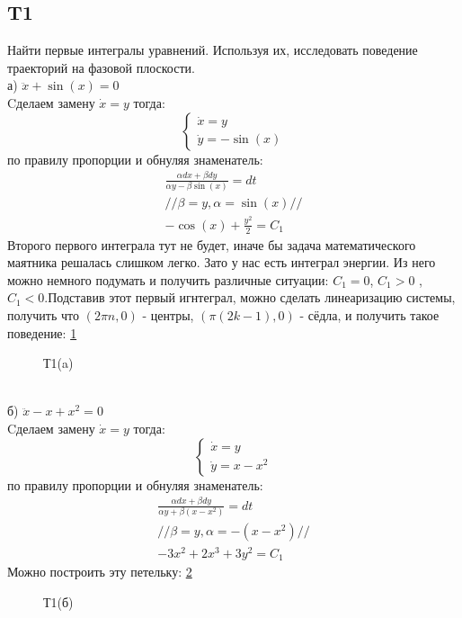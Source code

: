 \documentclass{article}
\begin{document}
\subsection{T1} 
Найти первые интегралы уравнений. Используя их, исследовать поведение траекторий на фазовой плоскости.\\
а) $\ddot x + \sin{(x)}=0$\\
Cделаем замену $\dot x = y$ тогда:
\begin{equation*}
    \begin{cases}
        \dot x=y\\
        \dot y = -\sin{(x)}
    \end{cases}
\end{equation*}
по правилу пропорции и обнуляя знаменатель:
\begin{gather*}
    \frac{\alpha dx + \beta dy}{\alpha y - \beta \sin{(x)}}=dt \\
     //\beta=y,\alpha=\sin{(x)}//\\ 
     -\cos{(x)}+\frac{y^2}{2}=C_1
\end{gather*}
Второго первого интеграла тут не будет, иначе бы задача математического маятника решалась слишком легко. Зато у нас есть интеграл энергии. Из него можно немного подумать и получить различные ситуации: $C_1=0$, $C_1>0$ , $C_1<0$.Подставив этот первый игнтеграл, можно сделать линеаризацию системы, получить что $(2\pi n,0)$ - центры, $(\pi (2k-1),0)$ - сёдла, и получить такое поведение: \ref{fig:Т1a}
\begin{figure}[h!]
\caption{Т1(a)}
\label{fig:Т1a}
\end{figure} \\
б) $\ddot x-x+x^2=0$ \\
Cделаем замену $\dot x = y$ тогда:
\begin{equation*}
    \begin{cases}
        \dot x=y\\
        \dot y = x-x^2
    \end{cases}
\end{equation*}
по правилу пропорции и обнуляя знаменатель:
\begin{gather*}
    \frac{\alpha dx + \beta dy}{\alpha y + \beta (x-x^2)}=dt \\
     //\beta=y,\alpha=-(x-x^2)//  \\ 
     -3x^2+2x^3+3y^2=C_1
\end{gather*}
Можно построить эту петельку: \ref{fig:Т1b}
\begin{figure}[h!]
\caption{Т1(б)}
\label{fig:Т1b}
\end{figure} \\
\end{document}
